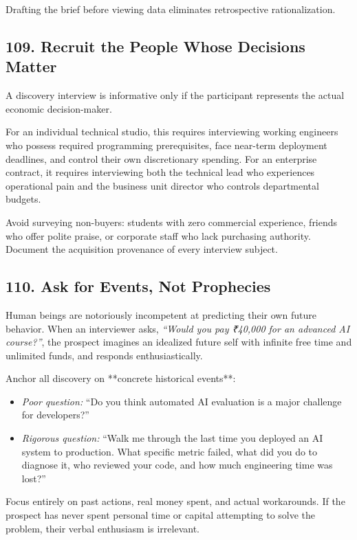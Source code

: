 Drafting the brief before viewing data eliminates retrospective rationalization.

\subsection*{109. Recruit the People Whose Decisions Matter}

A discovery interview is informative only if the participant represents the actual economic decision-maker.

For an individual technical studio, this requires interviewing working engineers who possess required programming prerequisites, face near-term deployment deadlines, and control their own discretionary spending. For an enterprise contract, it requires interviewing both the technical lead who experiences operational pain and the business unit director who controls departmental budgets.

Avoid surveying non-buyers: students with zero commercial experience, friends who offer polite praise, or corporate staff who lack purchasing authority. Document the acquisition provenance of every interview subject.

\subsection*{110. Ask for Events, Not Prophecies}

Human beings are notoriously incompetent at predicting their own future behavior. When an interviewer asks, \emph{``Would you pay ₹40,000 for an advanced AI course?''}, the prospect imagines an idealized future self with infinite free time and unlimited funds, and responds enthusiastically.

Anchor all discovery on **concrete historical events**:
\begin{itemize}
    \item \emph{Poor question:} ``Do you think automated AI evaluation is a major challenge for developers?''
    \item \emph{Rigorous question:} ``Walk me through the last time you deployed an AI system to production. What specific metric failed, what did you do to diagnose it, who reviewed your code, and how much engineering time was lost?''
\end{itemize}

Focus entirely on past actions, real money spent, and actual workarounds. If the prospect has never spent personal time or capital attempting to solve the problem, their verbal enthusiasm is irrelevant.


